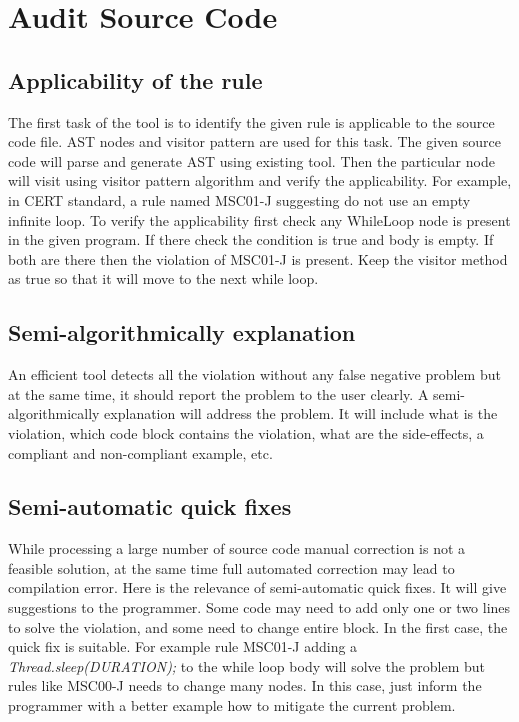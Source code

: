 	\section{Audit Source Code}
	\subsection{Applicability of the rule}
	The first task of the tool is to identify the given rule is applicable to the source code file. AST nodes and visitor pattern are used for this task. The given source code will parse and generate AST using existing tool. Then the particular node will visit using visitor pattern algorithm and verify the applicability. For example, in CERT standard, a rule named MSC01-J\cite{msc01j} suggesting do not use an empty infinite loop. To verify the applicability first check any WhileLoop node is present in the given program. If there check the condition is true and body is empty. If both are there then the violation of MSC01-J is present. Keep the visitor method as true so that it will move to the next while loop.
	\subsection{Semi-algorithmically explanation}
	An efficient tool detects all the violation without any false negative problem but at the same time, it should report the problem to the user clearly. A semi-algorithmically explanation will address the problem. It will include what is the violation, which code block contains the violation, what are the side-effects, a compliant and non-compliant example, etc. 
	\subsection{Semi-automatic quick fixes}
 While processing a large number of source code manual correction is not a feasible solution, at the same time full automated correction may lead to compilation error. Here is the relevance of semi-automatic quick fixes. It will give suggestions to the programmer. Some code may need  to add only one or two lines to solve the violation, and some need to change entire block. In the first case, the quick fix is suitable. For example rule MSC01-J\cite{msc01j} adding a  \textit{Thread.sleep(DURATION);} to the while loop body will solve the problem but rules like MSC00-J\cite{msc00j} needs to change many nodes. In this case, just inform the programmer with a better example how to mitigate the current problem.
	 
